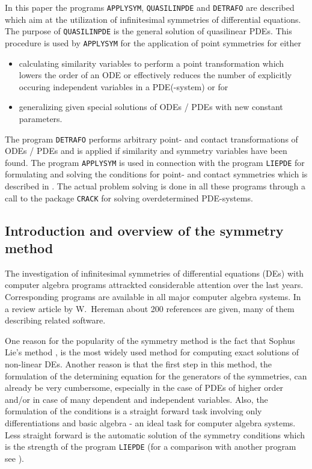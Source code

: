 
In this paper the programs {\tt APPLYSYM}, {\tt QUASILINPDE} and
{\tt DETRAFO} are described which aim at the utilization
of infinitesimal symmetries of differential equations. The purpose
of {\tt QUASILINPDE} is the general solution of
quasilinear PDEs. This procedure is used by {\tt APPLYSYM}
for the application of point symmetries for either
\begin{itemize}
\item calculating similarity variables to perform a point transformation
which lowers the order of an ODE or effectively reduces the number of
explicitly occuring independent variables in a PDE(-system) or for
\item generalizing given special solutions of ODEs / PDEs with new constant
parameters.
\end{itemize}

The program {\tt DETRAFO} performs arbitrary point- and contact
transformations of ODEs / PDEs and is applied if similarity
and symmetry variables have been found.
The program {\tt APPLYSYM} is used in connection with the program
{\tt LIEPDE} for formulating and solving the conditions for point- and
contact symmetries which is described in \cite{LIEPDE}.
The actual problem solving is done in all these programs through a call
to the package {\tt CRACK} for solving overdetermined PDE-systems.

\subsection{Introduction and overview of the symmetry \\ method}
The investigation of infinitesimal symmetries of differential equations
(DEs) with computer algebra programs attrackted considerable attention
over the last years. Corresponding programs are available in all
major computer algebra systems. In a review article by W.\ Hereman
\cite{WHer} about 200 references are given, many of them describing related
software.

One reason for the popularity of the symmetry method
is the fact that Sophus Lie's method
\cite{lie1},\cite{lie2} is the most widely
used method for computing exact solutions of non-linear DEs. Another reason is
that the first step in this
method, the formulation of the determining equation for the generators
of the symmetries, can already be very cumbersome, especially in the
case of PDEs of higher order and/or in case of many dependent and independent
variables. Also, the formulation of the conditions is a straight forward
task involving only differentiations and basic algebra - an ideal task for
computer algebra systems. Less straight forward is the automatic solution
of the symmetry conditions which is the strength of the program {\tt LIEPDE}
(for a comparison with another program see \cite{LIEPDE}).


